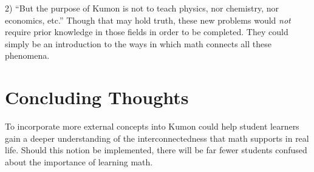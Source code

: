 \documentclass[fleqn]{article}
\begin{document}
2) ``But the purpose of Kumon is not to teach physics, nor chemistry, nor economics, etc.'' Though that may hold truth, these new problems would \textit{not} require prior knowledge in those fields in order to be completed. They could simply be an introduction to the ways in which math connects all these phenomena. 

\section{Concluding Thoughts}
To incorporate more external concepts into Kumon could help student learners gain a deeper understanding of the interconnectedness that math supports in real life. Should this notion be implemented, there will be far fewer students confused about the importance of learning math. 
\end{document}
